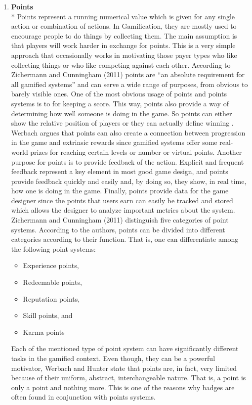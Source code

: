 \begin{enumerate}
\item \textbf{Points}\\*
Points represent a running numerical value which is given for any single action or combination of actions. In Gamification, they are mostly used to encourage people to do things by collecting them. The main assumption is that players will work harder in exchange for points. This is a very simple approach that occasionally works in motivating those payer types who like collecting things or who like competing against each other. According to Zichermann and Cunningham (2011) points are ``an absolute requirement for all gamified systems'' and can serve a wide range of purposes, from obvious to barely visible ones. One of the most obvious usage of points and points systems is to for keeping a score. This way, points also provide a way of determining how well someone is doing in the game. So points can either show the relative position of players or they can actually define winning \cite{WerbachCoursera}. Werbach argues that points can also create a connection between progression in the game and extrinsic rewards since gamified systems offer some real-world prizes for reaching certain levels or number or virtual points. Another purpose for points is to provide feedback of the action. Explicit and frequent feedback represent a key element in most good game design, and points provide feedback quickly and easily and, by doing so, they show, in real time, how one is doing in the game. Finally, points provide data for the game designer since the points that users earn can easily be tracked and stored which allows the designer to analyze important metrics about the system. Zichermann and Cunningham (2011) distinguish five categories of point systems. According to the authors, points  can  be  divided  into  different categories  according  to  their  function. That is, one can differentiate among the following point systems: 
\begin{itemize}
\item Experience points,
\item Redeemable points,
\item Reputation points, 
\item Skill points, and
\item Karma  points
\end{itemize}
Each of the mentioned type of point system can have significantly different tasks in the gamified context. Even though, they can be a powerful motivator, Werbach and Hunter state that points are, in fact, very limited because of their uniform, abstract, interchangeable nature. That is, a point is only a point and nothing more. This is one of the reasons why badges are often found in conjunction with points systems.

\end{enumerate}
